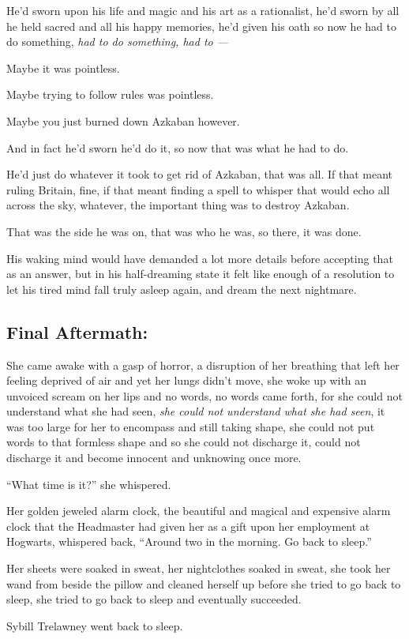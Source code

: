 He’d sworn upon his life and magic and his art as a rationalist, he’d sworn by all he held sacred and all his happy memories, he’d given his oath so now he had to do something, \emph{had to do something, had to —}

Maybe it was pointless.

Maybe trying to follow rules was pointless.

Maybe you just burned down Azkaban however.

And in fact he’d sworn he’d do it, so now that was what he had to do.

He’d just do whatever it took to get rid of Azkaban, that was all. If that meant ruling Britain, fine, if that meant finding a spell to whisper that would echo all across the sky, whatever, the important thing was to destroy Azkaban.

That was the side he was on, that was who he was, so there, it was done.

His waking mind would have demanded a lot more details before accepting that as an answer, but in his half-dreaming state it felt like enough of a resolution to let his tired mind fall truly asleep again, and dream the next nightmare.
\replacement{\sbreak}{}

\subsection{Final Aftermath:}

\noindent{}She came awake with a gasp of horror, a disruption of her breathing that left her feeling deprived of air and yet her lungs didn’t move, she woke up with an unvoiced scream on her lips and no words, no words came forth, for she could not understand what she had seen, \emph{she could not understand what she had seen}, it was too large for her to encompass and still taking shape, she could not put words to that formless shape and so she could not discharge it, could not discharge it and become innocent and unknowing once more.

“What time is it?” she whispered.

Her golden jeweled alarm clock, the beautiful and magical and expensive alarm clock that the Headmaster had given her as a gift upon her employment at Hogwarts, whispered back, “Around two in the morning. Go back to sleep.”

Her sheets were soaked in sweat, her nightclothes soaked in sweat, she took her wand from beside the pillow and cleaned herself up before she tried to go back to sleep, she tried to go back to sleep and eventually succeeded.

Sybill Trelawney went back to sleep.

